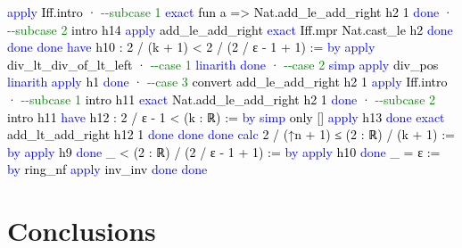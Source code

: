 \documentclass[
  letterpaper,
]{scrreprt}
\newenvironment{Shaded}{\begin{snugshade}}{\end{snugshade}}
\newcommand{\CommentTok}[1]{\textcolor[rgb]{0.37,0.37,0.37}{#1}}
\newcommand{\KeywordTok}[1]{\textcolor[rgb]{0.00,0.23,0.31}{#1}}
\newcommand{\NormalTok}[1]{\textcolor[rgb]{0.00,0.23,0.31}{#1}}
\renewcommand{\NormalTok}[1]{\textcolor[HTML]{000000}{#1}}
\renewcommand{\KeywordTok}[1]{\textcolor[HTML]{0000FF}{#1}}
\renewcommand{\CommentTok}[1]{\textcolor[HTML]{008000}{#1}}
\theoremstyle{remark}
\begin{document}
\begin{Shaded}
\begin{Highlighting}[]
      \KeywordTok{apply}\NormalTok{ Iff.intro}
\NormalTok{      · }\CommentTok{{-}{-}subcase 1}
        \KeywordTok{exact}\NormalTok{ fun a =\textgreater{} Nat.add\_le\_add\_right h2 1}
        \KeywordTok{done}
\NormalTok{      · }\CommentTok{{-}{-}subcase 2}
\NormalTok{        intro h14}
        \KeywordTok{apply}\NormalTok{ add\_le\_add\_right}
        \KeywordTok{exact}\NormalTok{ Iff.mpr Nat.cast\_le h2}
        \KeywordTok{done}
      \KeywordTok{done}
    \KeywordTok{done}
  \KeywordTok{have}\NormalTok{ h10 : 2 / (k + 1) \textless{} 2 / (2 / ε {-} 1 + 1) := }\KeywordTok{by}
    \KeywordTok{apply}\NormalTok{ div\_lt\_div\_of\_lt\_left}
\NormalTok{    · }\CommentTok{{-}{-}case 1}
      \KeywordTok{linarith}
      \KeywordTok{done}
\NormalTok{    · }\CommentTok{{-}{-}case 2}
      \KeywordTok{simp}
      \KeywordTok{apply}\NormalTok{ div\_pos}
      \KeywordTok{linarith}
      \KeywordTok{apply}\NormalTok{ h1}
      \KeywordTok{done}
\NormalTok{    · }\CommentTok{{-}{-}case 3}
\NormalTok{      convert add\_le\_add\_right h2 1}
      \KeywordTok{apply}\NormalTok{ Iff.intro}
\NormalTok{      · }\CommentTok{{-}{-}subcase 1}
\NormalTok{        intro h11}
        \KeywordTok{exact}\NormalTok{ Nat.add\_le\_add\_right h2 1}
        \KeywordTok{done}
\NormalTok{      · }\CommentTok{{-}{-}subcase 2}
\NormalTok{        intro h11}
        \KeywordTok{have}\NormalTok{ h12 : 2 / ε {-} 1 \textless{} (k : ℝ) := }\KeywordTok{by}
          \KeywordTok{simp}\NormalTok{ only []}
          \KeywordTok{apply}\NormalTok{ h13}
          \KeywordTok{done}
        \KeywordTok{exact}\NormalTok{ add\_lt\_add\_right h12 1}
        \KeywordTok{done}
      \KeywordTok{done}
    \KeywordTok{done}
  \KeywordTok{calc}
\NormalTok{    2 / (↑n + 1) ≤ (2 : ℝ) / (k + 1) := }\KeywordTok{by}
      \KeywordTok{apply}\NormalTok{ h9}
      \KeywordTok{done}
\NormalTok{    \_ \textless{} (2 : ℝ) / (2 / ε {-} 1 + 1) := }\KeywordTok{by}
      \KeywordTok{apply}\NormalTok{ h10}
      \KeywordTok{done}
\NormalTok{    \_ = ε := }\KeywordTok{by}
\NormalTok{      ring\_nf}
      \KeywordTok{apply}\NormalTok{ inv\_inv}
      \KeywordTok{done}
  \KeywordTok{done}
\end{Highlighting}
\end{Shaded}


\hypertarget{conclusions}{%
\chapter{Conclusions}\label{conclusions}}
\end{document}
